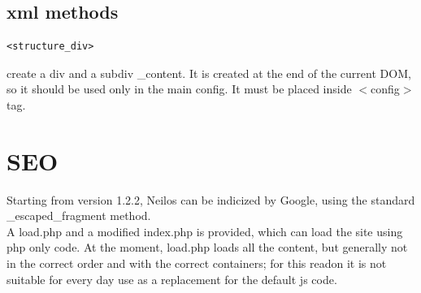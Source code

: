 \documentclass[a4paper,12pt]{article}
\begin{document}
\subsection{xml methods}
\begin{list}{-}{}
  \item \begin{verbatim}
<structure_div>         
        \end{verbatim}
create a div and a subdiv \_content. It is created at the end of the current DOM, so it should be used only in the main config. It must be placed inside $<$config$>$ tag.
\end{list}

\section{SEO}
Starting from version 1.2.2, Neilos can be indicized by Google, using the standard \_escaped\_fragment method.\\
A load.php and a modified index.php is provided, which can load the site using php only code.
At the moment, load.php loads all the content, but generally not in the correct order and with the correct containers; for this readon it is not suitable for every day use as a replacement for the default js code.
\end{document}
